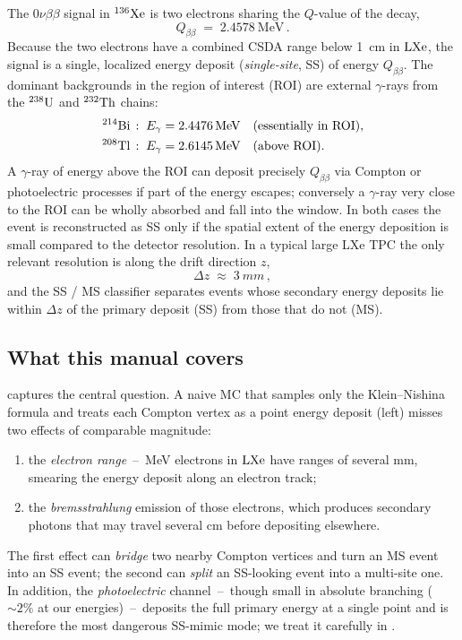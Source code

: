 \documentclass[11pt,a4paper]{article}
\newcommand{\Eg}{E_\gamma}
\newcommand{\Qbb}{Q_{\beta\beta}}
\newcommand{\zeronubb}{0\nu\beta\beta}
\begin{document}
The $\zeronubb$ signal in $\rm{}^{136}Xe$ is two electrons sharing
the $Q$-value of the decay,
\begin{equation}
  \Qbb \;=\; \SI{2.4578}{\MeV}\,.
\end{equation}
Because the two electrons have a combined CSDA range below
\SI{1}{cm} in $\rm LXe$, the signal is a single, localized energy
deposit (\emph{single-site}, SS) of energy $\Qbb$. The dominant
backgrounds in the region of interest (ROI) are external
$\gamma$-rays from the $\rm{}^{238}U$ and $\rm{}^{232}Th$ chains:
\begin{align*}
  \rm{}^{214}Bi\,&: \;\Eg=\SI{2.4476}{\MeV} \quad(\text{essentially in ROI}),\\
  \rm{}^{208}Tl\,&: \;\Eg=\SI{2.6145}{\MeV} \quad(\text{above ROI}).
\end{align*}
A $\gamma$-ray of energy above the ROI can deposit precisely $\Qbb$
via Compton or photoelectric processes if part of the energy
escapes; conversely a $\gamma$-ray very close to the ROI can be
wholly absorbed and fall into the window. In both cases the event
is reconstructed as SS only if the spatial extent of the energy
deposition is small compared to the detector resolution. In a
typical large LXe TPC the only relevant resolution is along the
drift direction $z$,
\begin{equation}
  \Delta z \;\approx\; \SI{3}{mm}\,,
\end{equation}
and the SS / MS classifier separates events whose secondary energy
deposits lie within $\Delta z$ of the primary deposit (SS) from
those that do not (MS).

\subsection{What this manual covers}

 captures the central question. A naive MC that
samples only the Klein--Nishina formula and treats each Compton
vertex as a point energy deposit (left) misses two effects of
comparable magnitude:
\begin{enumerate}\itemsep=0pt
  \item the \emph{electron range}~--~MeV electrons in $\rm LXe$
        have ranges of several mm, smearing the energy deposit
        along an electron track;
  \item the \emph{bremsstrahlung} emission of those electrons,
        which produces secondary photons that may travel several
        cm before depositing elsewhere.
\end{enumerate}
The first effect can {\em bridge} two nearby Compton vertices and
turn an MS event into an SS event; the second can {\em split} an
SS-looking event into a multi-site one. In addition, the
\emph{photoelectric} channel~--~though small in absolute branching
($\sim 2\%$ at our energies)~--~deposits the full primary energy
at a single point and is therefore the most dangerous SS-mimic
mode; we treat it carefully in .
\end{document}
